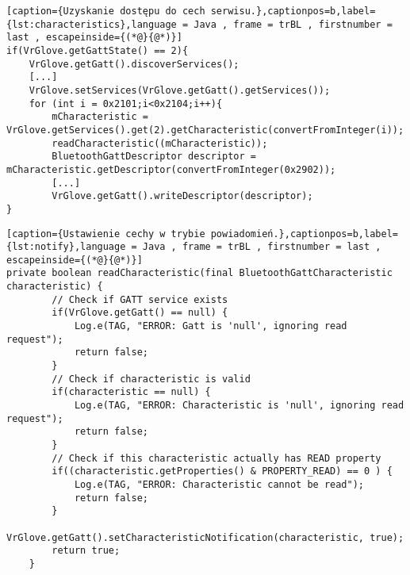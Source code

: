 \begin{lstlisting}[caption={Uzyskanie dostępu do cech serwisu.},captionpos=b,label={lst:characteristics},language = Java , frame = trBL , firstnumber = last , escapeinside={(*@}{@*)}]     
if(VrGlove.getGattState() == 2){
	VrGlove.getGatt().discoverServices();                                                   
	[...]
	VrGlove.setServices(VrGlove.getGatt().getServices());
	for (int i = 0x2101;i<0x2104;i++){
    	mCharacteristic = VrGlove.getServices().get(2).getCharacteristic(convertFromInteger(i));
        readCharacteristic((mCharacteristic));
        BluetoothGattDescriptor descriptor = mCharacteristic.getDescriptor(convertFromInteger(0x2902)); 
        [...]
        VrGlove.getGatt().writeDescriptor(descriptor);
}
\end{lstlisting}

\begin{lstlisting}[caption={Ustawienie cechy w trybie powiadomień.},captionpos=b,label={lst:notify},language = Java , frame = trBL , firstnumber = last , escapeinside={(*@}{@*)}]     
private boolean readCharacteristic(final BluetoothGattCharacteristic characteristic) {
		// Check if GATT service exists        
        if(VrGlove.getGatt() == null) {
            Log.e(TAG, "ERROR: Gatt is 'null', ignoring read request");
            return false;
        }
        // Check if characteristic is valid
        if(characteristic == null) {
            Log.e(TAG, "ERROR: Characteristic is 'null', ignoring read request");
            return false;
        }
        // Check if this characteristic actually has READ property
        if((characteristic.getProperties() & PROPERTY_READ) == 0 ) {
            Log.e(TAG, "ERROR: Characteristic cannot be read");
            return false;
        }
        VrGlove.getGatt().setCharacteristicNotification(characteristic, true);
        return true;
    }                                                      
\end{lstlisting}

